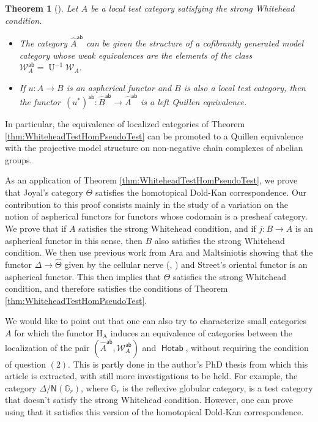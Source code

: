 \documentclass[10pt, english, a4paper, nothms]{amsart}
\theoremstyle{plain}
\newtheorem*{theorem*}{Theorem}
\theoremstyle{remark}
\theoremstyle{definition}
\numberwithin{equation}{theorem}
\newcommand\Grefl{\mathbb{G}_r}
\newcommand{\pref}[1]{{\widehat{ #1 }}}
\newcommand{\tranche}[2]{#1/{#2}}
\newcommand{\W}{\mathcal{W}}
\newcommand{\Hotab}{\operatorname{\mathsf{Hotab}}}
\newcommand{\ab}{{\mathsf{ab}}}
\newcommand{\Hf}[1]{\operatorname{H_{#1}}}
\newcommand{\prefab}[1]{\widehat{ #1 }^{\mathsf{ab}}}
\newcommand{\Wab}{\W^{\ab}}
\DeclareMathOperator{\U}{U}
\newcommand{\nerf}{\mathsf{N}}
\begin{document}
\begin{theorem*}[]
Let $A$ be a local test category satisfying the strong Whitehead condition.
\begin{itemize}
\item[\normalfont{(\ref{thm:modelStructureAbPresheaves})}]
The category $\prefab{A}$ can be given the structure of a cofibrantly generated
model category whose weak equivalences are the elements of the class $\Wab_A =
\U^{-1}\W_A$. 
\item[\normalfont{(\ref{prop:foncteurAspheriqueEqQuillenAb})}]
If $u : A \to B$ is an aspherical functor and $B$ is also a local test category,
then the functor~$(u^*)^\ab : \prefab{B} \to \prefab{A}$ is a left Quillen
equivalence.
\end{itemize}
\end{theorem*}

In particular, the equivalence of localized categories of Theorem
\ref{thm:WhiteheadTestHomPseudoTest} can be promoted to a Quillen equivalence
with the projective model structure on non-negative chain complexes of abelian
groups.

As an application of Theorem \ref{thm:WhiteheadTestHomPseudoTest}, we prove that
Joyal's category $\Theta$ satisfies the homotopical Dold-Kan correspondence. 
Our contribution to this proof consists mainly in the study of a variation on
the notion of aspherical functors for functors whose codomain is a presheaf
category. We prove that if $A$ satisfies the strong Whitehead condition, and if
$j: B \to \pref{A}$ is an aspherical functor in this sense, then $B$ also
satisfies the strong Whitehead condition. We then use previous work from Ara and
Maltsiniotis \cite{ara2022compnerfs} showing that the functor $\Delta \to
\pref{\Theta}$ given by the cellular nerve (\cite{batanin2000multitude},
\cite{berger2002cellular}) and Street's oriental functor
\cite{street1987algebra} is an aspherical functor. This then implies that
$\Theta$ satisfies the strong Whitehead condition, and therefore satisfies the
conditions of Theorem \ref{thm:WhiteheadTestHomPseudoTest}. 

We would like to point out that one can also try to characterize small
categories $A$ for which the functor $\Hf{A}$ induces an equivalence of
categories between the localization of the pair $(\prefab{A},\Wab_A)$ and
$\Hotab$, without requiring the condition of question $(2)$. This is partly done
in the author's PhD thesis \cite{hubert2025phd} from which this article is
extracted, with still more investigations to be held.
For example, the category $\tranche{\Delta}{\nerf(\Grefl)}$, where $\Grefl$ is
the reflexive globular category, is a test category that doesn't satisfy the
strong Whitehead condition. However, one can prove using
\cite[Proposition~4.3.6]{hubert2025phd} that it satisfies this version of the
homotopical Dold-Kan correspondence.
\end{document}
